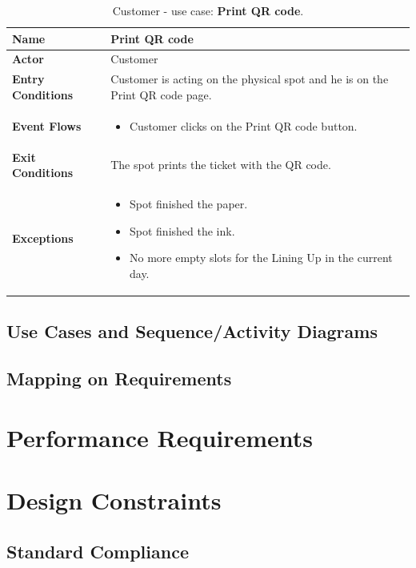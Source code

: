 \begin{table}[hbt!]
\centering
\begin{tabular}{| m{} | m{} |} 
	\hline
	\textbf{Name} & Print QR code \\ 
	\hline
	\textbf{Actor} & Customer \\ 
	\hline
	\textbf{Entry Conditions} & Customer is acting on the physical spot and he is on the Print QR code page. \\ 
	\hline
	\textbf{Event Flows} &
	\begin{itemize}
	\item Customer clicks on the Print QR code button.
	\end{itemize} \\ 
	\hline
	\textbf{Exit Conditions} & The spot prints the ticket with the QR code. \\ 
	\hline
	\textbf{Exceptions} &
	\begin{itemize}
	\item Spot finished the paper.
	\item Spot finished the ink.
	\item No more empty slots for the Lining Up in the current day.
	\end{itemize} \\ 
	\hline
\end{tabular}
\caption{Customer - use case: \textbf{Print QR code}.}
\label{tableLogIn}
\end{table}


\subsection{Use Cases and Sequence/Activity Diagrams}
\subsection{Mapping on Requirements}

\section{Performance Requirements}

\section{Design Constraints}

\subsection{Standard Compliance}
